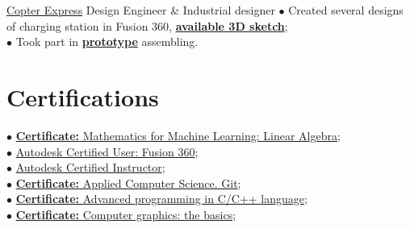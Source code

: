 \documentclass[]{cv-class}
\begin{document}
\begin{minipage}[t]{0.64\textwidth}
    {\href{https://copterexpress.com/}{Copter Express}}
    {Design Engineer \& Industrial designer}
    {\textcolor{bullet_col}{$\bullet$} Created several designs of charging station in Fusion 360, \href{https://myhub.autodesk360.com/ue2971508/shares/public/SHabee1QT1a327cf2b7a7d7742f9b8a0285b}{\textbf{available 3D sketch}}; \\
    \textcolor{bullet_col}{$\bullet$} Took part in \href{https://www.youtube.com/watch?v=RjX6nUqw1mI}{\textbf{prototype}} assembling.
    }

\smallSeparator{0.4pt}
\section{Certifications}
    \textcolor{bullet_col}{$\bullet$} \href{https://www.coursera.org/account/accomplishments/certificate/APDHC473Q5H7}{\textbf{Certificate:} Mathematics for Machine Learning: Linear Algebra}; \\
    \textcolor{bullet_col}{$\bullet$} \href{https://www.youracclaim.com/badges/e136c126-c834-408b-b380-beaa949e9180/public_url}{Autodesk Certified User: Fusion 360}; \\
    \textcolor{bullet_col}{$\bullet$} \href{https://www.youracclaim.com/badges/c0436850-b62e-45b4-95fa-6f1b49ca56b6/public_url}{Autodesk Certified Instructor}; \\
    \textcolor{bullet_col}{$\bullet$} \href{https://stepik.org/certificate/86b5b40faf74372730b30f98272ef8a9640ad069.pdf}{\textbf{Certificate:} Applied Computer Science. Git}; \\
    \textcolor{bullet_col}{$\bullet$} \href{https://stepik.org/certificate/93a178ba1662133d84ddb47bed17106eb4a4c8b2.pdf}{\textbf{Certificate:} Advanced programming in C/C++ language}; \\
    \textcolor{bullet_col}{$\bullet$} \href{https://stepik.org/certificate/ffb76dc11c287a0219ffb3e5aee43d2a104bcbb6.pdf}{\textbf{Certificate:} Computer graphics: the basics}; \\
    
\smallSeparator{0.4pt}

\end{minipage}
\end{document}
